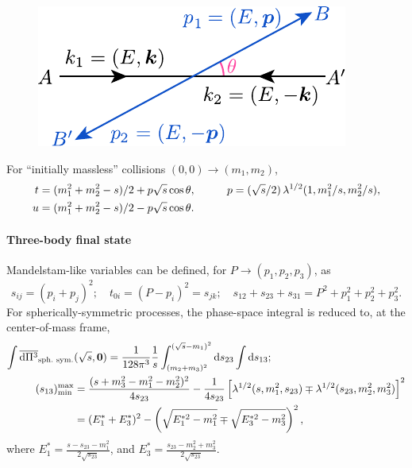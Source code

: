 \documentclass[CheatSheet]{subfiles}
\begin{document}
\begin{figure}\vspace{-2em}
 \includegraphics[width=\linewidth,page=2]{figs/collision.pdf}
\end{figure}

\noindent
For ``initially massless'' collisions $(0,0)\to (m_1,m_2)$,
\begin{alignat*}{2}
 t &= (m_1^2+m_2^2-s)/2+p\sqrt{s}\cos\theta,\qquad
&p&=(\sqrt{s}/2)\Kallen[1/2](1,m_1^2/s,m_2^2/s),\\
 u &= (m_1^2+m_2^2-s)/2-p\sqrt{s}\cos\theta.
\end{alignat*}

\paragraph{Three-body final state} Mandelstam-like variables can be defined, for $P\to(p_1,p_2,p_3)$, as
\begin{equation*}
s_{ij}=(p_i+p_j)^2;\quad t_{0i}=(P-p_i)^2=s_{jk};\quad s_{12}+s_{23}+s_{31}=P^2+p_1^2+p_2^2+p_3^2.
\end{equation*}
For spherically-symmetric processes, the phase-space integral is reduced to, at the center-of-mass frame,
\begin{align}
\int\overline{\dd\Pi^3}_{\text{sph.\ sym.}}&(\sqrt{s}, \vc 0)
=\frac{1}{128\pi^3}\frac{1}{s}
\int_{(m_2+m_3)^2}^{(\sqrt{s}-m_1)^2}\dd s_{23}\int\dd s_{13};
\\ (s_{13})^{\text{max}}_{\text{min}} &=
\frac{(s+m_3^2-m_1^2-m_2^2)^2}{4s_{23}}
-\frac{1}{4s_{23}}
\left[\Kallen[1/2](s,m_1^2,s_{23})\mp\Kallen[1/2](s_{23},m_2^2,m_3^2)\right]^2
\notag\\&=(E_1^*+E_3^*)^2-\left(\sqrt{E_1^{*2}-m_1^2}\mp\sqrt{E_3^{*2}-m_3^2}\right)^2,
\quad
\end{align}
where 
$E_1^*=\frac{s-s_{23}-m_1^2}{2\sqrt{s_{23}}}$, and
$E_3^*=\frac{s_{23}-m_2^2+m_3^2}{2\sqrt{s_{23}}}$.
\end{document}
